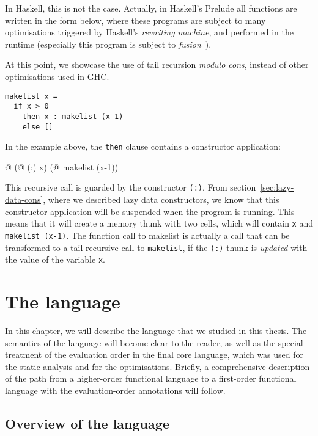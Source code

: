 \documentclass[diploma]{softlab-thesis}
\begin{document}
In Haskell, this is not the case. Actually, in Haskell's Prelude all functions are written 
in the form below, where these programs are subject to many optimisations triggered 
by Haskell's \textit{rewriting machine}, and performed in the runtime 
(especially this program is subject to \textit{fusion}~\cite{Coutts07}). 

At this point, we showcase the use of tail recursion \textit{modulo cons}, instead of other optimisations
used in GHC.

\begin{verbatim}
makelist x = 
  if x > 0 
    then x : makelist (x-1)
    else []
\end{verbatim}

In the example above, the \texttt{then} clause contains a constructor 
application: 
\begin{center}
  @ (@ (:) x) (@ makelist (x-1))
\end{center}

This recursive call is guarded by the constructor \texttt{(:)}.
From section~\ref{sec:lazy-data-cons}, where we described lazy data constructors,
we know that this constructor application will be suspended when 
the program is running. This means that it will create a memory 
thunk with two cells, which will contain \texttt{x} and \texttt{makelist (x-1)}.
The function call to makelist is actually a call that can be transformed 
to a tail-recursive call to \texttt{makelist}, if the \texttt{(:)} thunk is \textit{updated} 
with the value of the variable \texttt{x}. 

\chapter {The language}
\label{ch:language}

In this chapter, we will describe the language that we studied in this thesis.
The semantics of the language will become clear to the reader, as well as 
the special treatment of the evaluation order in the final core 
language, which was used for the static analysis and for the optimisations. Briefly, a 
comprehensive description of the path from a higher-order functional language 
to a first-order functional language with the evaluation-order annotations will follow.

\section {Overview of the language }
\label{sec:language-overview}
\end{document}
